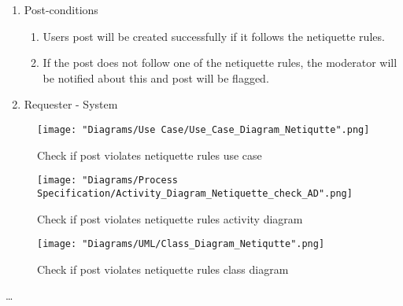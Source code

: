 \documentclass[12pt]{article}
\begin{document}
\begin{enumerate}
\begin{enumerate}
\begin{enumerate}
    	\end{enumerate}
     	\item Post-conditions
    	\begin{enumerate}
  	  		\item Users post will be created successfully if it follows the netiquette rules.
  	  		\item If the post does not follow one of the netiquette rules, the moderator will be notified about this and post will be flagged.
   	 	\end{enumerate}
   	 	\item Requester - System
  	\end{enumerate}
  	\begin{figure}[h]
  		\centering
  		\texttt{[image: "Diagrams/Use Case/Use\_Case\_Diagram\_Netiqutte".png]}
  		\caption{Check if post violates netiquette rules use case}
  	\end{figure}
  	\begin{figure}[h]
  		\centering
  		\texttt{[image: "Diagrams/Process Specification/Activity\_Diagram\_Netiquette\_check\_AD".png]}
  		\caption{Check if post violates netiquette rules activity diagram}
  	\end{figure}
  	\begin{figure}[h]
  		\centering
  		\texttt{[image: "Diagrams/UML/Class\_Diagram\_Netiqutte".png]}
  		\caption{Check if post violates netiquette rules class diagram}
  	\end{figure}
  \ldots
\end{enumerate}
\end{document}
